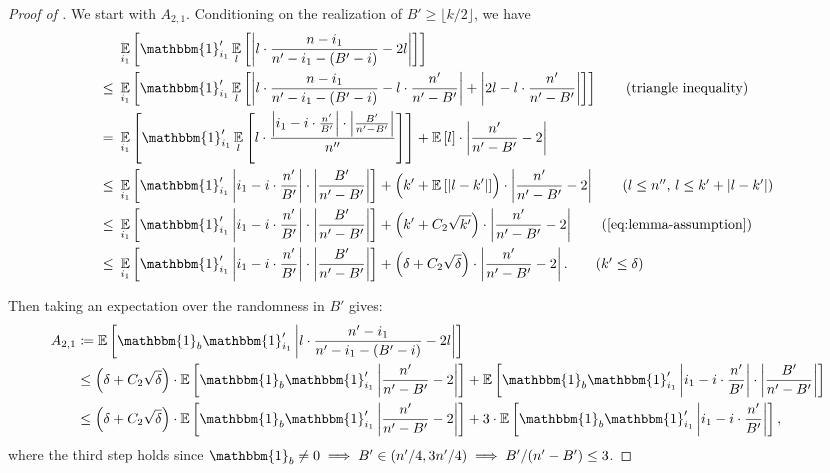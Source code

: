 \begin{proof}[Proof of ]
We start with $A_{2,1}$. Conditioning on the realization of $B' \ge \lfloor k/2 \rfloor$, we have
\begin{align*}
    &~\Ex{i_1}{\mathbbm{1}_{i_1}'\Ex{l}{\left|l\cdot \frac{n-i_1}{n'-i_1 - (B'-i)} - 2l\right|}}\\
\le &~\Ex{i_1}{\mathbbm{1}_{i_1}'\Ex{l}{\left|l\cdot \frac{n-i_1}{n'-i_1 - (B'-i)} - l\cdot \frac{n'}{n'-B'}\right| + \left|2l- l\cdot \frac{n'}{n'-B'}\right|}} \tag{triangle inequality}\\
=   &~\Ex{i_1}{\mathbbm{1}_{i_1}' \Ex{l}{l\cdot\frac{\left|i_1 - i\cdot \frac{n'}{B'}\right|\cdot \left|\frac{B'}{n'-B'}\right|}{n''}}} + \Ex{}{l}\cdot \left|\frac{n'}{n'-B'} - 2\right|\\
\le &~\Ex{i_1 }{\mathbbm{1}_{i_1}'\left|i_1 - i\cdot \frac{n'}{B'}\right|\cdot \left|\frac{B'}{n'-B'}\right|} +\left(k' + \Ex{}{\left|l - k'\right|}\right)\cdot \left|\frac{n'}{n'-B'} - 2\right|\tag{$l \le n''$, $l \le k' + |l - k'|$} \\
\le &~\Ex{i_1}{\mathbbm{1}_{i_1}'\left|i_1 - i\cdot \frac{n'}{B'}\right|\cdot \left|\frac{B'}{n'-B'}\right|} +\left(k' + C_2\sqrt{k'}\right)\cdot \left|\frac{n'}{n'-B'} - 2\right| \tag{\Cref{eq:lemma-assumption}}\\
\le &~\Ex{i_1}{\mathbbm{1}_{i_1}' \left|i_1 - i\cdot \frac{n'}{B'}\right|\cdot \left|\frac{B'}{n'-B'}\right|} +\left(\delta + C_2\sqrt{\delta}\right)\cdot \left|\frac{n'}{n'-B'} - 2\right|. \tag{$k' \le \delta$}
\end{align*}

Then taking an expectation over the randomness in $B'$ gives:
\begin{align*}
    A_{2,1}
&\coloneqq  \Ex{}{\mathbbm{1}_b\mathbbm{1}_{i_1}'\left|l\cdot \frac{n'-i_1}{n'-i_1 - (B'-i)} - 2l\right|}\\
&\le        \left(\delta + C_2\sqrt{\delta}\right)\cdot \Ex{}{\mathbbm{1}_b\mathbbm{1}_{i_1}'\left|\frac{n'}{n'-B'} - 2\right|}+ \Ex{}{\mathbbm{1}_b\mathbbm{1}_{i_1}' \left|i_1 - i\cdot \frac{n'}{B'}\right|\cdot \left|\frac{B'}{n'-B'}\right|}\\
&\le        \left(\delta + C_2\sqrt{\delta}\right)\cdot  \Ex{}{\mathbbm{1}_b\mathbbm{1}_{i_1}'\left|\frac{n'}{n'-B'} - 2\right|} +  3\cdot \Ex{}{ \mathbbm{1}_b\mathbbm{1}_{i_1}'\left|i_1 - i\cdot \frac{n'}{B'}\right|},
\end{align*}
where the third step holds since $\mathbbm{1}_b \ne 0 \implies B' \in (n'/4, 3n'/4) \implies B' / (n' - B') \le 3$.


\end{proof}
